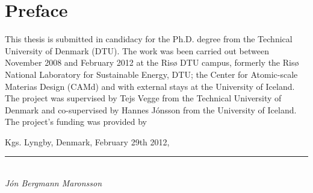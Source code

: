\section*{Preface}

This thesis is submitted in candidacy for the Ph.D. degree from the Technical University of Denmark (DTU).
The work was been carried out between November 2008 and February 2012 at the Ris\o{} DTU campus, formerly the Ris\o{} National Laboratory for Sustainable Energy, DTU; the Center for Atomic-scale Materias Design (CAMd) and with external stays at the University of Iceland.
The project was supervised by Tejs Vegge from the Technical University of Denmark and co-supervised by Hannes J\'onsson from the University of Iceland.
The project's funding was provided by \expand

\vspace{10mm}
\begin{flushright}
Kgs. Lyngby, Denmark, February 29th 2012,\\

\vspace{15mm}

\rule{50mm}{0.1pt}\\
\textit{J\'on Bergmann Maronsson}
\end{flushright}
